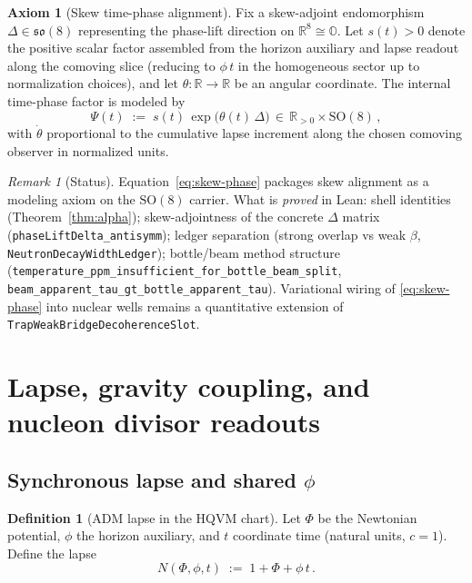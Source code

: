 \documentclass[11pt,a4paper]{article}
\theoremstyle{plain}
\theoremstyle{definition}
\newtheorem{definition}[theorem]{Definition}
\theoremstyle{remark}
\newtheorem{remark}[theorem]{Remark}
\theoremstyle{plain}
\theoremstyle{definition}
\newtheorem{axiom}[theorem]{Axiom}
\begin{document}
\begin{axiom}[Skew time-phase alignment]\label{ax:skew}
Fix a skew-adjoint endomorphism $\Delta\in\mathfrak{so}(8)$ representing the phase-lift direction on $\mathbb{R}^8\cong\mathbb{O}$.
Let $s(t)>0$ denote the positive scalar factor assembled from the horizon auxiliary and lapse readout along the comoving slice (reducing to $\phi\,t$ in the homogeneous sector up to normalization choices), and let $\theta:\mathbb{R}\to\mathbb{R}$ be an angular coordinate.
The internal time-phase factor is modeled by
\begin{equation}\label{eq:skew-phase}
  \Psi(t) \;:=\; s(t)\,\exp\!\bigl(\theta(t)\,\Delta\bigr)\,\in\,\mathbb{R}_{>0}\times \mathrm{SO}(8)\,,
\end{equation}
with $\dot{\theta}$ proportional to the cumulative lapse increment along the chosen comoving observer in normalized units.
\end{axiom}

\begin{remark}[Status]
Equation~\eqref{eq:skew-phase} packages skew alignment as a modeling axiom on the
$\mathrm{SO}(8)$ carrier. What is \emph{proved} in Lean: shell identities
(Theorem~\ref{thm:alpha}); skew-adjointness of the concrete $\Delta$ matrix
(\texttt{phaseLiftDelta\_antisymm}); ledger separation (strong overlap vs weak $\beta$,
\texttt{NeutronDecayWidthLedger}); bottle/beam method structure
(\texttt{temperature\_ppm\_insufficient\_for\_bottle\_beam\_split},
\texttt{beam\_apparent\_tau\_gt\_bottle\_apparent\_tau}). Variational wiring of
\eqref{eq:skew-phase} into nuclear wells remains a quantitative extension of
\texttt{TrapWeakBridgeDecoherenceSlot}.
\end{remark}

\section{Lapse, gravity coupling, and nucleon divisor readouts}

\subsection{Synchronous lapse and shared $\phi$}

\begin{definition}[ADM lapse in the HQVM chart]\label{def:lapse}
Let $\Phi$ be the Newtonian potential, $\phi$ the horizon auxiliary, and $t$ coordinate time (natural units, $c=1$).
Define the lapse
\begin{equation}\label{eq:lapse}
  N(\Phi,\phi,t) \;:=\; 1+\Phi+\phi\,t\,.
\end{equation}
\end{definition}
\end{document}
